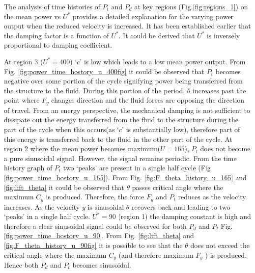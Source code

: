 The analysis of time histories of $P_t $ and $P_d$ at key regions (Fig.\ref{fig:regions_1}) on the mean power vs $U^*$ provides a detailed explanation for the varying power output when the reduced velocity is increased. It has been established earlier that the damping factor is a function of $U^*$. It could be derived that $U^*$ is inversely proportional to damping coefficient. 








At region 3 ($U^*= 400$) `$c$' is low which leads to a low mean power output. From Fig. \ref{fig:power_time_hostory_u_400fig} it could be observed that $P_t$ becomes negative over some portion of the cycle signifying power being transferred from the structure to the fluid. During this portion of the period, $\theta$ increases past the point where $F_y$ changes direction and the fluid forces are opposing the direction of travel. From an energy perspective, the mechanical damping is not sufficient to dissipate out the energy transferred from the fluid to the structure during the part of the cycle when this occurs(as `$c$' is substantially low), therefore  part of this energy is transferred back to the fluid in the other part of the cycle. At region 2 where the  mean power becomes maximum($U=165$), $P_t$ does not become a pure sinusoidal signal. However, the  signal remains periodic. From the time history graph of $P_t$ two `peaks' are present in a single half cycle (Fig \ref{fig:power_time_hostory_u_165}). From  Fig. \ref{fig:F_theta_history_u_165} and \ref{fig:lift_theta} it could be observed that $\theta$ passes critical angle where the maximum $C_y$ is produced. Therefore, the force $F_y$ and $P_t$ reduces as the velocity increases. As the velocity $\dot{y}$ is sinusoidal $\theta$ recovers back and leading to two `peaks'  in a single half cycle.  $U^*=90$ (region 1) the damping constant is high and therefore a clear sinusoidal signal could be observed for both $P_d$ and $P_t$ Fig. \ref{fig:power_time_hostory_u_90}. From Fig. \ref{fig:lift_theta} and  \ref{fig:F_theta_history_u_90fig}  it is possible to see that the $\theta$  does not exceed the critical angle where the maximum $C_y$ (and therefore maximum $F_y$ ) is produced. Hence both $P_d$ and $P_t$ becomes sinusoidal.
  






